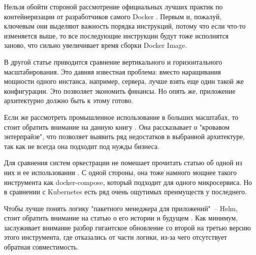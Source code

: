 Нельзя обойти стороной рассмотрение официальных лучших практик по контейнеризации от разработчиков самого Docker \cite{docker:best-practicies}. Первым и, пожалуй, ключевым они выделяют важность порядка инструкций, потому что если что-то изменяется выше, то все последующие инструкции будут тоже исполнятся заново, что сильно увеличивает время сборки Docker Image.

В другой статье \cite{wang2019developing} приводится сравнение вертикального и горизонтального масштабирования. Это давняя известная проблема: вместо наращивания мощности одного инстанса, например, сервера, лучше взять еще один такой же конфигурации. Это позволяет экономить финансы. Но опять же, приложение архитектурно должно быть к этому готово.

Если же рассмотреть промышленное использование в больших масштабах, то стоит обратить внимание на данную книгу \cite{indrasiri2018microservices}. Она рассказывает о "кровавом энтерпрайзе", что позволяет выявить ряд недостатков в выбранной архитектуре, так как не всегда она подходит под нужды бизнеса.

Для сравнения систем оркестрации не помешает прочитать статью об одной из них и ее использовании \cite{naik2016building}. С одной стороны, она тоже намного мощнее такого инструмента как docker-compose, который подходит для одного микросервиса. Но в сравнении с Kubernetes есть ряд очень ощутимых преимуществ у последнего.

Чтобы лучше понять логику "пакетного менеджера для приложений"\ -- Helm, стоит обратить внимание на статью о его истории и будущем \cite{habr:flant:helm}. Как минимум, заслуживает внимание разбор гигантское обновление со второй на третью версию этого инструмента, где отказались от части логики, из-за чего отсутствует обратная совместимость.

